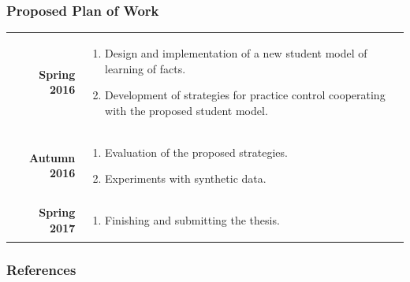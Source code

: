 \documentclass[xcolor=svgnames]{beamer}
\begin{document}
\begin{frame}
\frametitle{Proposed Plan of Work}
\begin{tabularx}{\textwidth}{rX}
	\textbf{Spring 2016} &
		\vspace{-0.5cm}
		\begin{enumerate}
			\item Design and implementation of a new student model of learning of
				facts.
			\item Development of strategies for practice control cooperating with the
				proposed student model.
		\end{enumerate}\\
	\textbf{Autumn 2016} &
		\vspace{-0.5cm}
		\begin{enumerate}
			\item Evaluation of the proposed strategies.
			\item Experiments with synthetic data.
		\end{enumerate}\\
	\textbf{Spring 2017} &
		\vspace{-0.5cm}
		\begin{enumerate}
			\item Finishing and submitting the thesis.
		\end{enumerate}
\end{tabularx}
\end{frame}
\begin{frame}[t,allowframebreaks]
	\frametitle{References}
	\printbibliography[notcategory=fullcited]
\end{frame}
\end{document}
